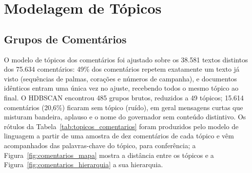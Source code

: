 \section{Modelagem de Tópicos}\label{sec:topicos}

\subsection{Grupos de Comentários}

O modelo de tópicos dos comentários foi ajustado sobre os 38.581 textos distintos dos 75.634 comentários: 49\% dos comentários repetem exatamente um texto já visto (sequências de palmas, corações e números de campanha), e documentos idênticos entram uma única vez no ajuste, recebendo todos o mesmo tópico ao final. O HDBSCAN encontrou 485 grupos brutos, reduzidos a 49 tópicos; 15.614 comentários (20,6\%) ficaram sem tópico (ruído), em geral mensagens curtas que misturam bandeira, aplauso e o nome do governador sem conteúdo distintivo. Os rótulos da Tabela~\ref{tab:topicos_comentarios} foram produzidos pelo modelo de linguagem a partir de uma amostra de dez comentários de cada tópico e vêm acompanhados das palavras-chave do tópico, para conferência; a Figura~\ref{fig:comentarios_mapa} mostra a distância entre os tópicos e a Figura~\ref{fig:comentarios_hierarquia} a sua hierarquia.

